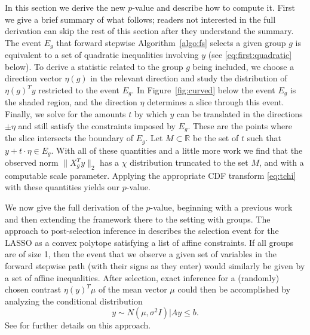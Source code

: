 \documentclass{imsart}
\begin{document}
In this section we derive the new $p$-value and describe how to compute it.
First we give a brief summary of what follows; readers not interested in the full derivation can skip the rest of this section after they understand the summary. The event $E_g$ that forward stepwise Algorithm~\ref{algo:fs} selects a given group $g$ is equivalent to a set of quadratic inequalities involving $y$ (see \eqref{eq:first:quadratic} below). To derive a statistic related to the group $g$ being included, we choose a direction vector $\eta(g)$ in the relevant direction and study the distribution of $\eta(g)^Ty$ restricted to the event $E_g$. In Figure~\ref{fig:curved} below the event $E_g$ is the shaded region, and the direction $\eta$ determines a slice through this event. Finally, we solve for the amounts $t$ by which $y$ can be translated in the directions $\pm \eta$ and still satisfy the constraints imposed by $E_g$. These are the points where the slice intersects the boundary of $E_g$. Let $M \subset \mathbb R$ be the set of $t$ such that $y + t\cdot\eta \in E_g$. With all of these quantities and a little more work we find that the observed norm $\| X_g^Ty \|_2$ has a $\chi$ distribution truncated to the set $M$, and with a computable scale parameter. Applying the appropriate CDF transform \eqref{eq:tchi} with these quantities yields our $p$-value.

We now give the full derivation of the $p$-value, beginning with a previous work and then extending the framework there to the setting with groups.
The approach to post-selection inference in \cite{lasso:fixed}
describes the selection event for the LASSO as a convex polytope
satisfying a list of affine constraints.
If all groups are of size 1, then
the event that we observe a given set of variables
in the forward stepwise path (with their signs as they enter) would similarly
be given by a set of affine inequalities.
After selection, exact inference for a (randomly) chosen contrast $\eta(y)^T\mu$ of the mean vector
$\mu$ could then be accomplished by analyzing the conditional distribution
\begin{equation}
y \sim N(\mu, \sigma^2 I) \bigl| Ay \leq b.
\end{equation}
See \cite{lasso:fixed,exact:lars} for further details on this approach.
\end{document}
